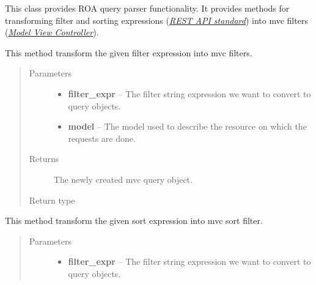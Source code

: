 \documentclass[letterpaper,10pt,english]{sphinxmanual}
\begin{document}
\begin{fulllineitems}
\label{features/roa/technical_summary:fantastico.roa.query_parser.QueryParser}
This class provides ROA query parser functionality. It provides methods for transforming filter and sorting expressions
({\hyperref[features/roa/rest_standard::doc]{\emph{REST API standard}}}) into mvc filters ({\hyperref[features/mvc::doc]{\emph{Model View Controller}}}).

\begin{fulllineitems}
\label{features/roa/technical_summary:fantastico.roa.query_parser.QueryParser.parse_filter}
This method transform the given filter expression into mvc filters.
\begin{quote}\begin{description}
\item[{Parameters}] \leavevmode\begin{itemize}
\item {} 
\textbf{filter\_expr} -- The filter string expression we want to convert to query objects.

\item {} 
\textbf{model} -- The model used to describe the resource on which the requests are done.

\end{itemize}

\item[{Returns}] \leavevmode
The newly created mvc query object.

\item[{Return type}] \leavevmode
{\hyperref[features/mvc:fantastico.mvc.models.model_filter.ModelFilterAbstract]{}}

\end{description}\end{quote}

\end{fulllineitems}


\begin{fulllineitems}
\label{features/roa/technical_summary:fantastico.roa.query_parser.QueryParser.parse_sort}
This method transform the given sort expression into mvc sort filter.
\begin{quote}\begin{description}
\item[{Parameters}] \leavevmode\begin{itemize}
\item {} 
\textbf{filter\_expr} -- The filter string expression we want to convert to query objects.


\end{itemize}
\end{description}
\end{quote}
\end{fulllineitems}
\end{fulllineitems}
\end{document}
